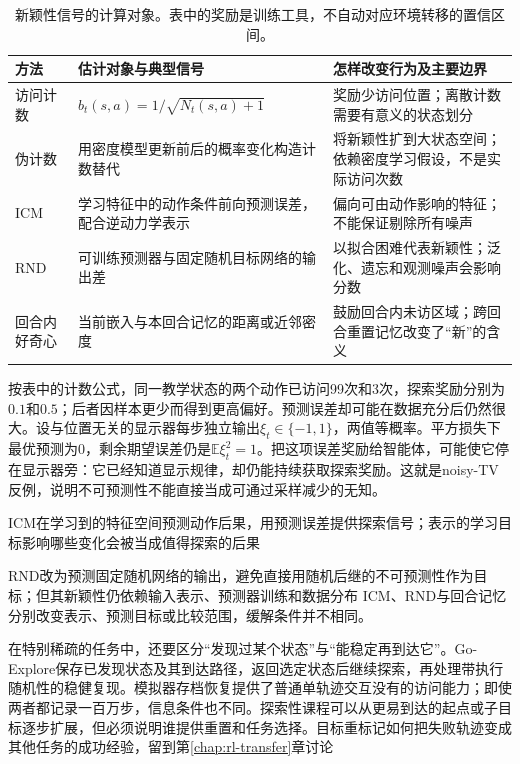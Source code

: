 \begin{table}[t]
  \centering
  \small
  \begin{tabularx}{\linewidth}{>{\raggedright\arraybackslash}p{24mm} >{\raggedright\arraybackslash}X >{\raggedright\arraybackslash}X}
    \toprule
    方法 & 估计对象与典型信号 & 怎样改变行为及主要边界 \\
    \midrule
    访问计数 & $b_t(s,a)=1/\sqrt{N_t(s,a)+1}$ & 奖励少访问位置；离散计数需要有意义的状态划分 \\
    伪计数 & 用密度模型更新前后的概率变化构造计数替代 & 将新颖性扩到大状态空间；依赖密度学习假设，不是实际访问次数 \\
    ICM & 学习特征中的动作条件前向预测误差，配合逆动力学表示 & 偏向可由动作影响的特征；不能保证剔除所有噪声 \\
    RND & 可训练预测器与固定随机目标网络的输出差 & 以拟合困难代表新颖性；泛化、遗忘和观测噪声会影响分数 \\
    回合内好奇心 & 当前嵌入与本回合记忆的距离或近邻密度 & 鼓励回合内未访区域；跨回合重置记忆改变了“新”的含义 \\
    \bottomrule
  \end{tabularx}
  \caption{新颖性信号的计算对象。表中的奖励是训练工具，不自动对应环境转移的置信区间。}
  \label{tab:rl-learning-intrinsic}
\end{table}

按表中的计数公式，同一教学状态的两个动作已访问99次和3次，探索奖励分别为$0.1$和$0.5$；后者因样本更少而得到更高偏好。预测误差却可能在数据充分后仍然很大。设与位置无关的显示器每步独立输出$\xi_t\in\{-1,1\}$，两值等概率。平方损失下最优预测为0，剩余期望误差仍是$\mathbb E\xi_t^2=1$。把这项误差奖励给智能体，可能使它停在显示器旁：它已经知道显示规律，却仍能持续获取探索奖励。这就是noisy-TV反例，说明不可预测性不能直接当成可通过采样减少的无知。

ICM在学习到的特征空间预测动作后果，用预测误差提供探索信号；表示的学习目标影响哪些变化会被当成值得探索的后果

RND改为预测固定随机网络的输出，避免直接用随机后继的不可预测性作为目标；但其新颖性仍依赖输入表示、预测器训练和数据分布
ICM、RND与回合记忆分别改变表示、预测目标或比较范围，缓解条件并不相同。

在特别稀疏的任务中，还要区分“发现过某个状态”与“能稳定再到达它”。Go-Explore保存已发现状态及其到达路径，返回选定状态后继续探索，再处理带执行随机性的稳健复现。模拟器存档恢复提供了普通单轨迹交互没有的访问能力；即使两者都记录一百万步，信息条件也不同。探索性课程可以从更易到达的起点或子目标逐步扩展，但必须说明谁提供重置和任务选择。目标重标记如何把失败轨迹变成其他任务的成功经验，留到第\ref{chap:rl-transfer}章讨论

